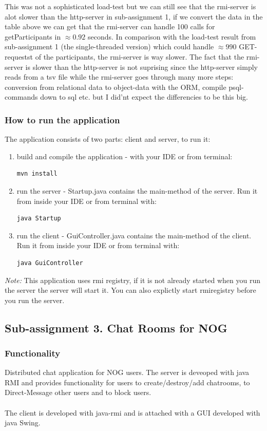 \documentclass[a4paper, 11pt]{article}
\begin{document}
This was not a sophisticated load-test but we can still see that the rmi-server is alot slower than the http-server in sub-assignment 1, if we convert the data in the table above we can get that the rmi-server can handle 100 calls for getParticipants in $\approx 0.92$ seconds. In comparison with the load-test result from sub-assignment 1 (the single-threaded version) which could handle $\approx 990$ GET-requestst of the participants, the rmi-server is way slower. The fact that the rmi-server is slower than the http-server is not suprising since the http-server simply reads from a tsv file while the rmi-server goes through many more steps: conversion from relational data to object-data with the ORM, compile psql-commands down to sql etc. but I did'nt expect the differencies to be this big.
\subsubsection{How to run the application}
The application consists of two parts: client and server, to run it:
\begin{enumerate}
\item build and compile the application - with your IDE or from terminal:
\begin{verbatim}
mvn install
\end{verbatim}
\item run the server - Startup.java contains the main-method of the server. Run it from inside your IDE or from terminal with: 
\begin{verbatim}
java Startup
\end{verbatim}
\item run the client - GuiController.java contains the main-method of the client. Run it from inside your IDE or from terminal with: 
\begin{verbatim}
java GuiController
\end{verbatim}
\end{enumerate}
\textit{Note:} This application uses rmi registry, if it is not already started when you run the server the server will start it. You can also explictly start rmiregistry before you run the server.
\subsection{Sub-assignment 3. Chat Rooms for NOG}
\subsubsection{Functionality}
Distributed chat application for NOG users.
The server is deveoped with java RMI and provides functionality for users to create/destroy/add chatrooms, to Direct-Message other users and to block users.
\\ \\The client is developed with java-rmi and is attached with a GUI developed with java Swing.
\end{document}
